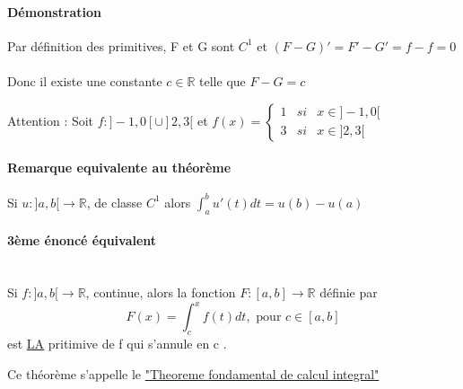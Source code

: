 \paragraph{Démonstration} Par définition des primitives, F et G sont $C^1$ et $(F-G)' = F' - G' = f-f=0$ ~\\
Donc il existe une constante $c \in \mathbb{R}$ telle que $F-G=c$

Attention : Soit $f : ]-1, 0[ \cup ]2, 3[$ et $f(x) = \left\{ \begin{array}{rcl}
																1 &si& x \in ]-1, 0[ \\
																3 &si& x \in ]2, 3[ \end{array}\right.$

\paragraph{Remarque equivalente au théorème}
Si $u : ]a, b[ \rightarrow \mathbb{R}$, de classe $C^1$ alors $\int_a^b u'(t)dt = u(b)-u(a)$

\paragraph{3ème énoncé équivalent} ~\\
Si $f : ]a, b[ \rightarrow \mathbb{R}$, continue, alors la fonction $F:[a, b] \rightarrow \mathbb{R}$ définie par \[F(x) = \int_c^x f(t)dt, \text{ pour } c \in [a, b]\]
est \ul{LA} pritimive de f qui s'annule en c .

Ce théorème s'appelle le \ul{"Theoreme fondamental de calcul integral"}

